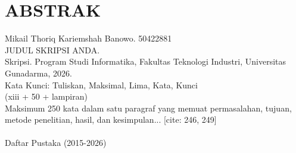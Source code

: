 \documentclass[12pt, a4paper]{report}
\begin{document}
	\setcounter{page}{2} 
	
	
	
	\chapter*{ABSTRAK}
	\begin{singlespace} %
		\noindent Mikail Thoriq Kariemshah Banowo. 50422881\\
		JUDUL SKRIPSI ANDA.\\
		Skripsi. Program Studi Informatika, Fakultas Teknologi Industri, Universitas Gunadarma, 2026.\\
		Kata Kunci: Tuliskan, Maksimal, Lima, Kata, Kunci\\
		(xiii + 50 + lampiran)\\
		
		Maksimum 250 kata dalam satu paragraf yang memuat permasalahan, tujuan, metode penelitian, hasil, dan kesimpulan... [cite: 246, 249]
		\\ \\
		Daftar Pustaka (2015-2026) %
	\end{singlespace}
	\clearpage
	
	
	
	\tableofcontents
	\clearpage
	
	\clearpage
	\pagestyle{fancy}      %

	
	
	
	
	
	
	\clearpage
	\pagestyle{plain} %
	
	
\end{document}
